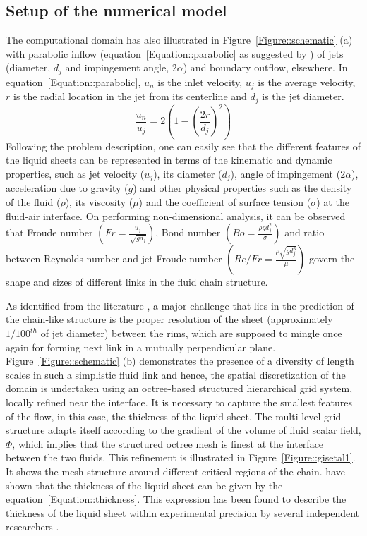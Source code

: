 \subsection{Setup of the numerical model}
The computational domain has also illustrated in Figure~\ref{Figure::schematic} (a) with parabolic inflow (equation~\ref{Equation::parabolic} as suggested by \citet{choo2007effect}) of jets (diameter, $d_j$ and impingement angle, $2\alpha$) and boundary outflow, elsewhere. In equation~\ref{Equation::parabolic}, $u_n$ is the inlet velocity, $u_j$ is the average velocity, $r$ is the radial location in the jet from its centerline and $d_j$ is the jet diameter.
\begin{equation}\label{Equation::parabolic}
\frac{u_n}{u_j} = 2\left(1 - \left(\frac{2r}{d_j}\right)^2\right) 
\end{equation}
Following the problem description, one can easily see that the different features of the liquid sheets can be represented in terms of the kinematic and dynamic properties, such as jet velocity ($u_j$), its diameter ($d_j$), angle of impingement (2$\alpha$), acceleration due to gravity ($g$) and other physical properties such as the density of the fluid ($\rho$), its viscosity ($\mu$) and the coefficient of surface tension ($\sigma$) at the fluid-air interface. On performing non-dimensional analysis, it can be observed that Froude number $\left(Fr = \frac{u_j}{\sqrt{gd_j}}\right)$, Bond number $\left(Bo = \frac{\rho gd_j^2}{\sigma}\right)$ and ratio between Reynolds number and jet Froude number $\left(Re/Fr = \frac{\rho\sqrt{gd_j^3}}{\mu}\right)$ govern the shape and sizes of different links in the fluid chain structure.\\\par
As identified from the literature \citep{chen2013high,zhang2017effects}, a major challenge that lies in the prediction of the chain-like structure is the proper resolution of the sheet (approximately $1/100^{th}$ of jet diameter) between the rims, which are supposed to mingle once again for forming next link in a mutually perpendicular plane. Figure~\ref{Figure::schematic} (b) demonstrates the presence of a diversity of length scales in such a simplistic fluid link and hence, the spatial discretization of the domain is undertaken using an octree-based structured hierarchical grid system, locally refined near the interface. It is necessary to capture the smallest features of the flow, in this case, the thickness of the liquid sheet. The multi-level grid structure adapts itself according to the gradient of the volume of fluid scalar field, $\Phi$, which implies that the structured octree mesh is finest at the interface between the two fluids. This refinement is illustrated in Figure~\ref{Figure::gisetal1}. It shows the mesh structure around different critical regions of the chain. \citet{hasson1964thickness,choo2001parametric} have shown that the thickness of the liquid sheet can be given by the equation~\ref{Equation::thickness}. This expression has been found to describe the thickness of the liquid sheet within experimental precision by several independent researchers \citep{poulikakos1998thickness,choo2001parametric,ekimova2015liquid}.
